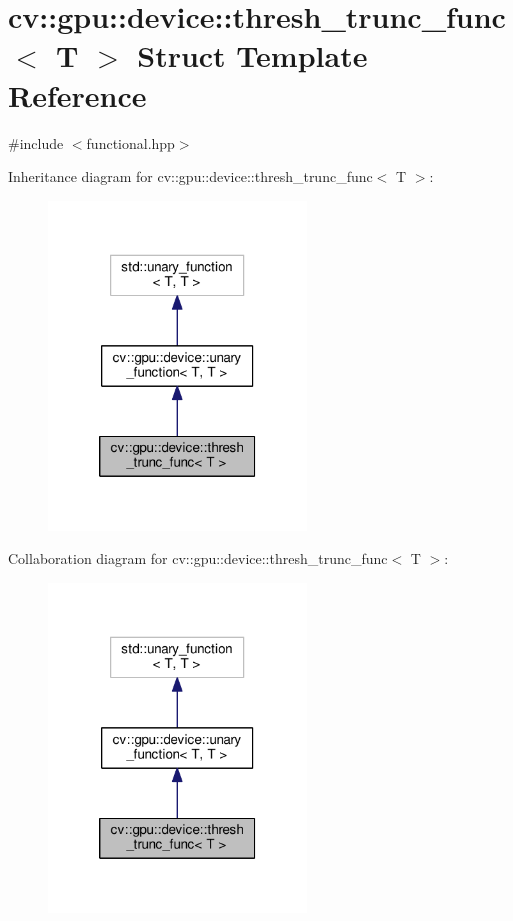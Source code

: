 \hypertarget{structcv_1_1gpu_1_1device_1_1thresh__trunc__func}{\section{cv\-:\-:gpu\-:\-:device\-:\-:thresh\-\_\-trunc\-\_\-func$<$ T $>$ Struct Template Reference}
\label{structcv_1_1gpu_1_1device_1_1thresh__trunc__func}
}


{\ttfamily \#include $<$functional.\-hpp$>$}



Inheritance diagram for cv\-:\-:gpu\-:\-:device\-:\-:thresh\-\_\-trunc\-\_\-func$<$ T $>$\-:\nopagebreak
\begin{figure}[H]
\begin{center}
\leavevmode
\includegraphics[width=194pt]{structcv_1_1gpu_1_1device_1_1thresh__trunc__func__inherit__graph}
\end{center}
\end{figure}


Collaboration diagram for cv\-:\-:gpu\-:\-:device\-:\-:thresh\-\_\-trunc\-\_\-func$<$ T $>$\-:\nopagebreak
\begin{figure}[H]
\begin{center}
\leavevmode
\includegraphics[width=194pt]{structcv_1_1gpu_1_1device_1_1thresh__trunc__func__coll__graph}
\end{center}
\end{figure}

